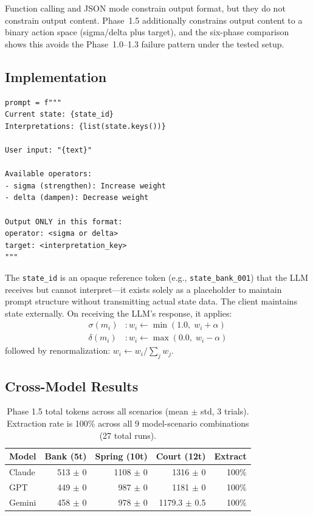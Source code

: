 \documentclass[11pt,a4paper]{article}
\begin{document}
Function calling and JSON mode constrain output format, but they do not constrain
output content. Phase~1.5 additionally constrains output content to a binary
action space (sigma/delta plus target), and the six-phase comparison
shows this avoids the Phase~1.0--1.3 failure pattern under the tested setup.

\subsection{Implementation}

\begin{lstlisting}
prompt = f"""
Current state: {state_id}
Interpretations: {list(state.keys())}

User input: "{text}"

Available operators:
- sigma (strengthen): Increase weight
- delta (dampen): Decrease weight

Output ONLY in this format:
operator: <sigma or delta>
target: <interpretation_key>
"""
\end{lstlisting}

The \texttt{state\_id} is an opaque reference token (e.g., \texttt{state\_bank\_001})
that the LLM receives but cannot interpret---it exists solely as a placeholder
to maintain prompt structure without transmitting actual state data. The client
maintains state externally. On receiving the LLM's response, it applies:
\begin{align}
\sigma(m_i) &: w_i \leftarrow \min(1.0,\; w_i + \alpha) \\
\delta(m_i) &: w_i \leftarrow \max(0.0,\; w_i - \alpha)
\end{align}
followed by renormalization: $w_i \leftarrow w_i / \sum_j w_j$.

\subsection{Cross-Model Results}

\begin{table}[ht]
\centering
\begin{tabular}{lrrrr}
\toprule
\textbf{Model} & \textbf{Bank (5t)} & \textbf{Spring (10t)} & \textbf{Court (12t)} & \textbf{Extract} \\
\midrule
Claude & 513 $\pm$ 0 & 1108 $\pm$ 0 & 1316 $\pm$ 0 & 100\% \\
GPT & 449 $\pm$ 0 & 987 $\pm$ 0 & 1181 $\pm$ 0 & 100\% \\
Gemini & 458 $\pm$ 0 & 978 $\pm$ 0 & 1179.3 $\pm$ 0.5 & 100\% \\
\bottomrule
\end{tabular}
\caption{Phase 1.5 total tokens across all scenarios (mean $\pm$ std, 3 trials).
Extraction rate is 100\% across all 9 model-scenario combinations (27 total runs).}
\label{tab:phase1_5}
\end{table}
\end{document}
